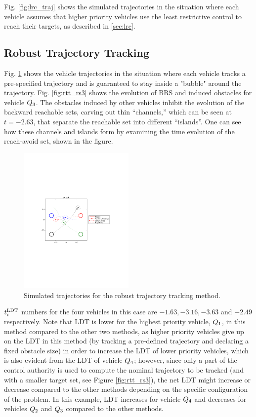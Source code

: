 Fig. \ref{fig:lrc_traj} shows the simulated trajectories in the situation where each vehicle assumes that higher priority vehicles use the least restrictive control to reach their targets, as described in \ref{sec:lrc}.

\subsection{Robust Trajectory Tracking}
Fig. \ref{fig:rtt_traj} shows the vehicle trajectories in the situation where each vehicle tracks a pre-specified trajectory and is guaranteed to stay inside a "bubble" around the trajectory. Fig. \ref{fig:rtt_rs3} shows the evolution of BRS and induced obstacles for vehicle $Q_3$. The obstacles induced by other vehicles inhibit the evolution of the backward reachable sets, carving out thin “channels,” which can be seen at $t = -2.63$, that separate the reachable set into different “islands”. One can see how these channels and islands form by examining the time evolution of the reach-avoid set, shown in the figure.

\begin{figure}
  \centering
  \includegraphics[width=0.5\textwidth]{"fig/rtt_traj"}
  \caption{Simulated trajectories for the robust trajectory tracking method.}
  \label{fig:rtt_traj}
\end{figure}

$t^\text{LDT}_i$ numbers for the four vehicles in this case are $-1.63, -3.16, -3.63$ and $-2.49$ respectively. Note that LDT is lower for the highest priority vehicle, $Q_1$, in this method compared to the other two methods, as higher priority vehicles give up on the LDT in this method (by tracking a pre-defined trajectory and declaring a fixed obstacle size) in order to increase the LDT of lower priority vehicles, which is also evident from the LDT of vehicle $Q_4$; however, since only a part of the control authority is used to compute the nominal trajectory to be tracked (and with a smaller target set, see Figure \ref{fig:rtt_rs3}), the net LDT might increase or decrease compared to the other methods depending on the specific configuration of the problem. In this example, LDT increases for vehicle $Q_4$ and decreases for vehicles $Q_2$ and $Q_3$ compared to the other methods.     

